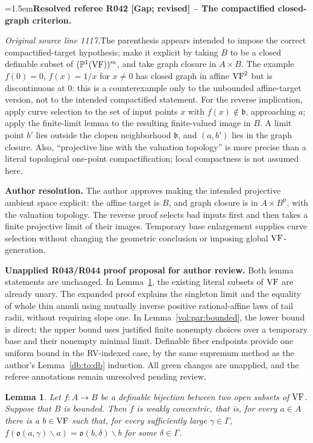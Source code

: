 \documentclass[12pt]{amsart}
\newcommand{\ResolvedRefereeRemark}[5]{%
  \par\medskip\begingroup\normalfont\small\color{gray}%
  \emergencystretch=1.5em\noindent\textbf{Resolved referee R#1 [#2] -- #3.}\par\nobreak\noindent #4\par
  \medskip\color{ResolutionGreen}\noindent\textbf{Author resolution.} #5\par
  \endgroup\medskip
}
\theoremstyle{plain}
\newtheorem{lem}[thm]{Lemma}
\theoremstyle{definition}
\theoremstyle{remark}
\numberwithin{equation}{section}
\theoremstyle{plain}
\newcommand{\VF}{\textup{VF}}
\newcommand{\gb}{\mathfrak{b}}
\newcommand{\go}{\mathfrak{o}}
\newcommand{\0}{\emptyset}
\newcommand{\fun}{\longrightarrow}
\newcommand{\mi}{\smallsetminus}
\begin{document}
\ResolvedRefereeRemark{042}{Gap; revised}{The compactified closed-graph criterion}{%
\textit{Original source line 1117.}\quad The parenthesis appears intended to impose the correct compactified-target hypothesis; make it explicit by taking $B$ to be a closed definable subset of $(\mathbb P^1(\VF))^m$, and take graph closure in $A\times B$. The example $f(0)=0$, $f(x)=1/x$ for $x\ne0$ has closed graph in affine $\VF^2$ but is discontinuous at $0$: this is a counterexample only to the unbounded affine-target version, not to the intended compactified statement. For the reverse implication, apply curve selection to the set of input points $x$ with $f(x)\notin\gb$, approaching $a$; apply the finite-limit lemma to the resulting finite-valued image in $B$. A limit point $b'$ lies outside the clopen neighborhood $\gb$, and $(a,b')$ lies in the graph closure. Also, ``projective line with the valuation topology'' is more precise than a literal topological one-point compactification; local compactness is not assumed here.
}{The author approves making the intended projective ambient space explicit: the affine target is $B$, and graph closure is in $A\times B^{\mathrm p}$, with the valuation topology. The reverse proof selects bad inputs first and then takes a finite projective limit of their images. Temporary base enlargement supplies curve selection without changing the geometric conclusion or imposing global $\VF$-generation.}


\par\medskip\begingroup\small\color{ResolutionGreen}\noindent\textbf{Unapplied R043/R044 proof proposal for author review.} Both lemma statements are unchanged. In Lemma~\ref{lim:weak}, the existing literal subsets of $\VF$ are already unary. The expanded proof explains the singleton limit and the equality of whole thin annuli using mutually inverse positive rational-affine laws of tail radii, without requiring slope one. In Lemma~\ref{vol:par:bounded}, the lower bound is direct; the upper bound uses justified finite nonempty choices over a temporary base and their nonempty minimal limit. Definable fiber endpoints provide one uniform bound in the RV-indexed case, by the same supremum method as the author's Lemma~\ref{db:to:db} induction. All green changes are unapplied, and the referee annotations remain unresolved pending review.\par\endgroup\medskip

\begin{lem}\label{lim:weak}
Let $f : A  \fun B$ be a definable bijection between two open subsets of $\VF$. Suppose that $B$ is bounded. Then $f$ is weakly concentric, that is, for every $a \in A$ there is a $b \in \VF$ such that, for every sufficiently large $\gamma \in \Gamma$, $f(\go(a, \gamma) \mi a) = \go(b, \delta) \mi b$ for some $\delta \in \Gamma$.
\end{lem}
\end{document}
